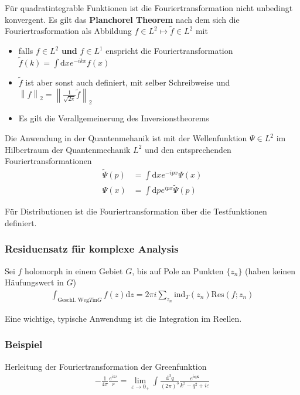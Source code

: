 \documentclass[11pt,a4paper]{report}
\newcommand{\norm}[1]{\left\lVert #1 \right\rVert}
\begin{document}
Für quadratintegrable Funktionen ist die Fouriertransformation nicht unbedingt konvergent.
Es gilt das \textbf{Planchorel Theorem} nach dem sich die Fouriertrasformation als Abbildung $f \in L^2 \mapsto \tilde{f} \in L^2$ mit 
\begin{itemize}
    \item falls $f \in L^2$ \textbf{und} $f \in L^1$ enspricht die Fouriertransformation $\tilde{f}(k) = \int \mathrm{d}x e^{-i k x} f(x)$
    \item $\tilde{f}$ ist aber sonst auch definiert, mit selber Schreibweise und $\norm{f}_2 = \norm{\frac{1}{\sqrt{2\pi}} \tilde{f}}_2$
    \item Es gilt die Verallgemeinerung des Inversionstheorems
\end{itemize}

Die Anwendung in der Quantenmehanik ist mit der Wellenfunktion $\Psi \in L^2$ im Hilbertraum der Quantenmechanik $L^2$ und den entsprechenden Fouriertransformationen
\begin{align*}
    \tilde{\Psi}(p) &= \int \mathrm{d}x e^{-i p x} \Psi(x) \\
    \Psi(x) &= \int \mathrm{d}p e^{i p x} \tilde{\Psi}(p)
\end{align*}

Für Distributionen ist die Fouriertransformation über die Testfunktionen definiert.
\subsubsection{Residuensatz für komplexe Analysis}

Sei $f$ holomorph in einem Gebiet $G$, bis auf Pole an Punkten $\{z_n\}$ (haben keinen Häufungswert in $G$)
\begin{align*}
    \int_{\text{Geschl. Weg} T \text{in} G} f(z) \mathrm{d}z = 2\pi i \sum_{z_n} \mathrm{ind}_T(z_n) \mathrm{Res}(f; z_n) 
\end{align*}

Eine wichtige, typische Anwendung ist die Integration im Reellen.

\subsubsection{Beispiel}

Herleitung der Fouriertransformation der Greenfunktion
\begin{align*}
    - \frac{1}{4\pi} \frac{e^{i k r}}{r} = \lim_{\varepsilon \rightarrow 0_+} \int \frac{\mathrm{d}^3 q}{(2\pi)^3} \frac{e^{i \mathbf{q} \mathbf{x}}}{k^2 - q^2 + i \varepsilon}
\end{align*}
\end{document}
